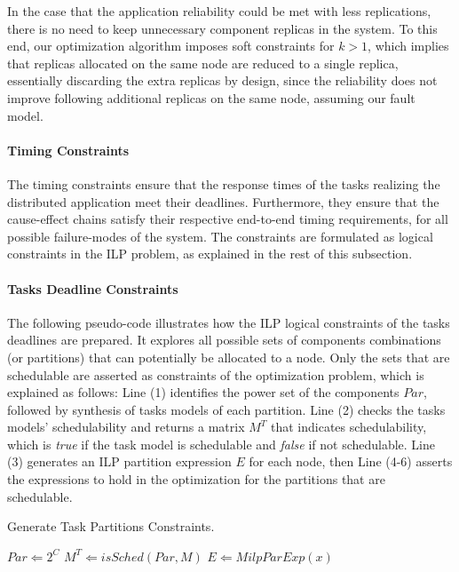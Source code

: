 In the case that the application reliability could be met with less replications, there is no need to keep unnecessary component replicas in the system. To this end, our optimization algorithm imposes soft constraints for $k>1$, which implies that replicas allocated on the same node are reduced to a single replica, essentially discarding the extra replicas by design, since the reliability does not improve following additional replicas on the same node, assuming our fault model.

\paragraph{Timing Constraints}
The timing constraints ensure that the response times of the tasks realizing the distributed application meet their deadlines. Furthermore, they ensure that the cause-effect chains satisfy their respective end-to-end timing requirements, for all possible failure-modes of the system. The constraints are formulated as logical constraints in the ILP problem, as explained in the rest of this subsection.

\paragraph*{Tasks Deadline Constraints}
The following pseudo-code illustrates how the ILP logical constraints of the tasks deadlines are prepared. It explores all possible sets of components combinations (or partitions) that can potentially be allocated to a node. Only the sets that are schedulable are asserted as constraints of the optimization problem, which is explained as follows: Line (1) identifies the power set of the components $Par$, followed by synthesis of tasks models of each partition. Line (2) checks the tasks models' schedulability and returns a matrix $M^T$ that indicates schedulability, which is \textit{true} if the task model is schedulable and \textit{false} if not schedulable. Line (3) generates an ILP partition expression $E$ for each node, then Line (4-6) asserts the expressions to hold in the optimization for the partitions that are schedulable.
\begin{algorithm}
\caption{Generate Task Partitions Constraints.}\label{alg_partition}
$Par \Leftarrow 2^C$\;	
$M^T\Leftarrow isSched(Par, M)$\;
$E\Leftarrow MilpParExp(x)$\;
\end{algorithm}

